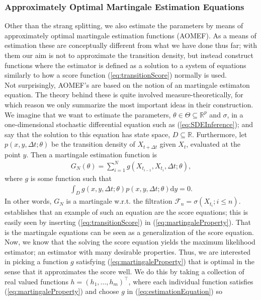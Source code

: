 \subsubsection{Approximately Optimal Martingale Estimation Equations}\label{subsubsec:approximatelyOptimalMartingaleEstimationEquation}
Other than the strang splitting, we also estimate the parameters by means of approximately optimal martingale estimation functions (AOMEF). As a means of estimation these are conceptually different from what we have done thus far; with them our aim is not to approximate the transition density, but instead construct functions where the estimator is defined as a solution to a system of equations similarly to how a score function (\ref{eq:transitionScore}) normally is used.\\
Not surprisingly, AOMEF's are based on the notion of an martingale estimaton equation. The theory behind these is quite involved measure-theoretically, for which reason we only summarize the most important ideas in their construction. We imagine that we want to estimate the parameters, $\theta\in \Theta \subseteq \mathbb{R}^p$ and $\sigma$, in a one-dimensional stochastic differential equation such as (\ref{eq:SDEInference}); and say that the solution to this equation has state space, $D\subseteq \mathbb{R}$. Furthermore, let $p(x, y, \Delta t; \theta)$ be the transition density of $X_{t+\Delta t}$ given $X_t$, evaluated at the point $y$. Then a martingale estimation function is 
\begin{align}
    G_N(\theta) = \sum_{i = 1}^N g(X_{t_{i - 1}}, X_{t_i}, \Delta t; \theta), \label{eq:estimationEquation}
\end{align}
where $g$ is some function such that
\begin{align}
    \int_{D} g(x, y, \Delta t; \theta)p(x, y, \Delta t; \theta)\mathrm{d}y = 0. \label{eq:martingaleProperty}
\end{align}
In other words, $G_N$ is a martingale w.r.t. the filtration $\mathcal{F}_n = \sigma\left(X_{t_i}; i \leq n\right)$. \cite[p. 11]{StatisticalMethodsForSDE} establishes that an example of such an equation are the score equations; this is easily seen by inserting (\ref{eq:transitionScore}) in (\ref{eq:martingaleProperty}). That is the martingale equations can be seen as a generalization of the score equation. Now, we know that the solving the score equation yields the maximum likelihood estimator; an estimator with many desirable properties. Thus, we are interested in picking a function $g$ satisfying (\ref{eq:martingaleProperty}) that is optimal in the sense that it approximates the score well. We do this by taking a collection of real valued functions $h = (h_1, \dots, h_m)^\top$, where each individual function satisfies (\ref{eq:martingaleProperty}) and choose $g$ in (\ref{eq:estimationEquation}) so
